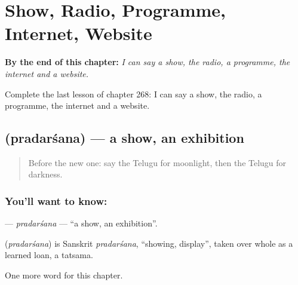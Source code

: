 
\chapter{Show, Radio, Programme, Internet, Website}
\label{ch:te-show-radio-programme-internet-website}

\begin{chapteropening}
\textbf{By the end of this chapter:} \emph{I can say a show, the radio, a programme, the internet and a website.}

Complete the last lesson of chapter 268: I can say a show, the radio, a programme, the internet and a website.
\end{chapteropening}

\section[\texorpdfstring{\te{ప్రదర్శన} (pradarśana)}{ప్రదర్శన (pradarśana)}]{ (pradarśana) — a show, an exhibition}

\label{lesson:TE-C268-pradarsana}



\begin{quote}
Before the new one: say the Telugu for moonlight, then the Telugu for darkness.
\end{quote}

\subsection*{You'll want to know: }
\textbf{} — \emph{pradarśana} — \textquotedblleft{}a show, an exhibition\textquotedblright{}.

\begin{cousinweb}
\textbf{} (\emph{pradarśana}) is Sanskrit \emph{pradarśana}, \textquotedblleft{}showing, display\textquotedblright{}, taken over whole as a learned loan, a tatsama.
\end{cousinweb}

\begin{grammarlens}[title={What you've built}]
One more word for this chapter.
\end{grammarlens}

